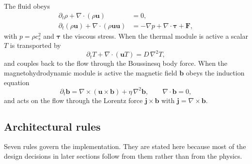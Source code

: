\documentclass[11pt,a4paper]{article}
\newcommand{\cs}{c_s}
\newcommand{\uu}{\bm{u}}
\newcommand{\bb}{\bm{b}}
\begin{document}
The fluid obeys
\begin{align}
  \partial_t \rho + \nabla\!\cdot(\rho\uu) &= 0, \\
  \partial_t(\rho\uu) + \nabla\!\cdot(\rho\uu\uu)
     &= -\nabla p + \nabla\!\cdot\bm{\tau} + \bm{F},
\end{align}
with $p=\rho\cs^2$ and $\bm{\tau}$ the viscous stress. When the thermal module is
active a scalar $T$ is transported by
\begin{equation}
  \partial_t T + \nabla\!\cdot(\uu T) = D\,\nabla^2 T ,
\end{equation}
and couples back to the flow through the Boussinesq body force. When the
magnetohydrodynamic module is active the magnetic field $\bb$ obeys the induction
equation
\begin{equation}
  \partial_t \bb = \nabla\times(\uu\times\bb) + \eta\,\nabla^2\bb,
  \qquad \nabla\!\cdot\bb = 0,
  \label{eq:induction}
\end{equation}
and acts on the flow through the Lorentz force $\bm{j}\times\bb$ with
$\bm{j}=\nabla\times\bb$.

\subsection{Architectural rules}
\label{sec:rules}

Seven rules govern the implementation. They are stated here because most of the
design decisions in later sections follow from them rather than from the physics.
\end{document}

